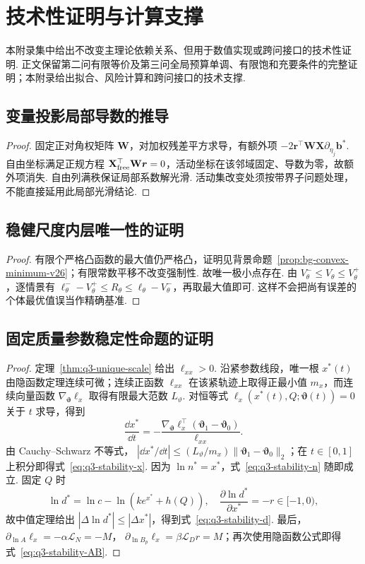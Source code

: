 \section{技术性证明与计算支撑}\label{app:technical-proofs}
本附录集中给出不改变主理论依赖关系、但用于数值实现或跨问接口的技术性证明. 正文保留第二问有限等价及第三问全局预算单调、有限饱和充要条件的完整证明；本附录给出拟合、风险计算和跨问接口的技术支撑. 

\subsection{变量投影局部导数的推导}\label{app:q2-projection-proof}
\begin{proof}固定正对角权矩阵 $\mathbf W$，对加权残差平方求导，有额外项 $-2\boldsymbol r^\top\mathbf W\mathbf X\partial_{\eta_j}\boldsymbol b^*$. 自由坐标满足正规方程 $\mathbf X_{\rm free}^\top\mathbf W\boldsymbol r=0$，活动坐标在该邻域固定、导数为零，故额外项消失. 自由列满秩保证局部系数解光滑. 活动集改变处须按带界子问题处理，不能直接延用此局部光滑结论. \end{proof}

\subsection{稳健尺度内层唯一性的证明}\label{app:q3-robust-proof}
\begin{proof}
有限个严格凸函数的最大值仍严格凸，证明见背景命题~\ref{prop:bg-convex-minimum-v26}；有限常数平移不改变强制性. 故唯一极小点存在. 由 $V^-_\theta\le V_\theta\le V^+_\theta$，逐情景有 $\ell^-_\theta-V^+_\theta\le R_\theta\le\ell_\theta-V^-_\theta$，再取最大值即可. 这样不会把尚有误差的个体最优值误当作精确基准. 
\end{proof}

\subsection{固定质量参数稳定性命题的证明}\label{app:q3-stability-proof}
\begin{proof}
定理~\ref{thm:q3-unique-scale} 给出 $\ell_{xx}>0$. 沿紧参数线段，唯一根 $x^*(t)$ 由隐函数定理连续可微；连续正函数 $\ell_{xx}$ 在该紧轨迹上取得正最小值 $m_x$，而连续向量函数 $\nabla_{\boldsymbol\vartheta}\ell_x$ 取得有限最大范数 $L_{\vartheta}$. 对恒等式
$\ell_x(x^*(t),Q;\boldsymbol\vartheta(t))=0$ 关于 $t$ 求导，得到
\[
\frac{\dd x^*}{\dd t}
=-\frac{\nabla_{\boldsymbol\vartheta}\ell_x^{\top}
(\boldsymbol\vartheta_1-\boldsymbol\vartheta_0)}{\ell_{xx}}.
\]
由 Cauchy--Schwarz 不等式，
$|\dd x^*/\dd t|\le(L_{\vartheta}/m_x)
\|\boldsymbol\vartheta_1-\boldsymbol\vartheta_0\|_2$；在 $t\in[0,1]$ 上积分即得式~\eqref{eq:q3-stability-x}. 因为 $\ln n^*=x^*$，式~\eqref{eq:q3-stability-n} 随即成立. 固定 $Q$ 时
\[
\ln d^*=\ln c-\ln(ke^{x^*}+h(Q)),\quad
\frac{\partial\ln d^*}{\partial x^*}=-r\in[-1,0),
\]
故中值定理给出
$|\Delta\ln d^*|\le|\Delta x^*|$，得到式~\eqref{eq:q3-stability-d}. 最后，
$\partial_{\ln A}\ell_x=-\alpha\mathcal L_N=-M$，
$\partial_{\ln B_p}\ell_x=\beta\mathcal L_Dr=M$；再次使用隐函数公式即得式~\eqref{eq:q3-stability-AB}. 
\end{proof}


